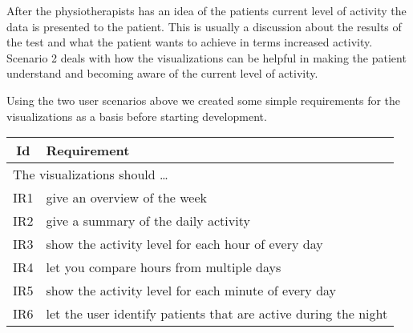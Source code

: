 After the physiotherapists has an idea of the patients current level of activity the data is presented to the patient. This is usually a discussion about the results of the test and what the patient wants to achieve in terms increased activity. Scenario 2 deals with how the visualizations can be helpful in making the patient understand and becoming aware of the current level of activity.

Using the two user scenarios above we created some simple requirements for the visualizations as a basis before starting development.

\begin{table}[h!]
  \begin{center}
  \begin{tabular}{|c|p{12cm}|}
    \hline
      \textbf{Id} & \textbf{Requirement} \\ \hline
    \multicolumn{2}{|l|}{The visualizations should \ldots} \\ \hline
      IR1 & give an overview of the week \\ \hline
      IR2 & give a summary of the daily activity \\ \hline
      IR3 & show the activity level for each hour of every day \\ \hline
      IR4 & let you compare hours from multiple days \\ \hline
      IR5 & show the activity level for each minute of every day \\ \hline
      IR6 & let the user identify patients that are active during the night \\ \hline
  \end{tabular}
  \end{center}
\end{table}
